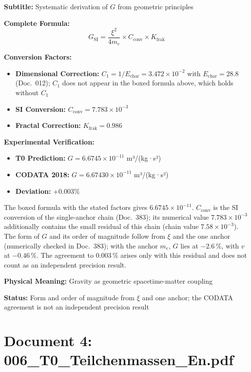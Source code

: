 	\begin{documentbox}
		\textbf{Subtitle:} Systematic derivation of $G$ from geometric principles
		
		\textbf{Complete Formula:}
		\begin{equation}
			\boxed{G_{\text{SI}} = \frac{\xi^2}{4 m_e} \times C_{\text{conv}} \times K_{\text{frak}}}
		\end{equation}
		
		\textbf{Conversion Factors:}
		\begin{itemize}
			\item \textbf{Dimensional Correction:} $C_1 = 1/E_{\text{char}} = 3.472 \times 10^{-2}$ with $E_{\text{char}} = 28.8$ (Doc.~012); $C_1$ does not appear in the boxed formula above, which holds without $C_1$
			\item \textbf{SI Conversion:} $C_{\text{conv}} = 7.783 \times 10^{-3}$
			\item \textbf{Fractal Correction:} $K_{\text{frak}} = 0.986$
		\end{itemize}
		
		\textbf{Experimental Verification:}
		\begin{itemize}
			\item \textbf{T0 Prediction:} $G = 6.6745 \times 10^{-11}$ m³/(kg·s²)
			\item \textbf{CODATA 2018:} $G = 6.67430 \times 10^{-11}$ m³/(kg·s²)
			\item \textbf{Deviation:} +0.003\%
		\end{itemize}
		
		The boxed formula with the stated factors gives $6.6745\times10^{-11}$. $C_{\text{conv}}$ is the SI conversion of the single-anchor chain (Doc.~383); its numerical value $7.783\times10^{-3}$ additionally contains the small residual of this chain (chain value $7.58\times10^{-3}$). The form of $G$ and its order of magnitude follow from $\xi$ and the one anchor (numerically checked in Doc.~383); with the anchor $m_e$, $G$ lies at $-2.6\,\%$, with $v$ at $-0.46\,\%$. The agreement to $0.003\,\%$ arises only with this residual and does not count as an independent precision result.
		
		\textbf{Physical Meaning:} Gravity as geometric spacetime-matter coupling
		
		\textbf{Status:} Form and order of magnitude from $\xi$ and one anchor; the CODATA agreement is not an independent precision result
	\end{documentbox}
	
	\section{Document 4: 006\_T0\_Teilchenmassen\_En.pdf}
	
